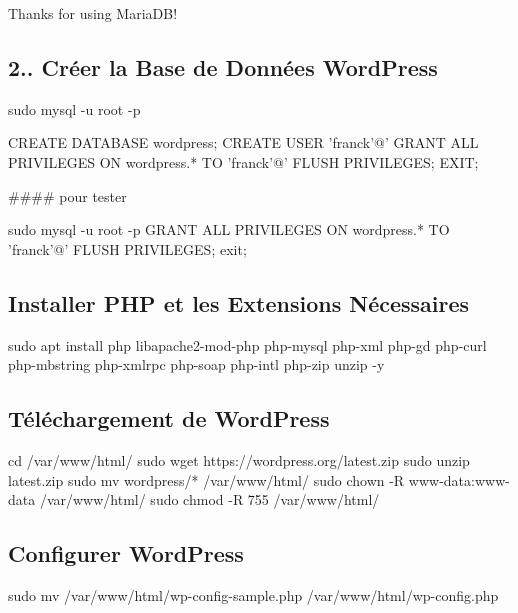 Thanks for using Maria\+D\+B!

\subsection*{2.. Créer la Base de Données Word\+Press}


\begin{DoxyCode}
sudo mysql -u root -p
\end{DoxyCode}



\begin{DoxyCode}
CREATE DATABASE wordpress;
CREATE USER 'franck'@'%
GRANT ALL PRIVILEGES ON wordpress.* TO 'franck'@'%
FLUSH PRIVILEGES;
EXIT;
\end{DoxyCode}


\#\#\#\# pour tester 
\begin{DoxyCode}
sudo mysql -u root -p
GRANT ALL PRIVILEGES ON wordpress.* TO 'franck'@'%
FLUSH PRIVILEGES;
exit;
\end{DoxyCode}
 \subsection*{Installer P\+HP et les Extensions Nécessaires}


\begin{DoxyCode}
sudo apt install php libapache2-mod-php php-mysql php-xml php-gd php-curl php-mbstring php-xmlrpc php-soap
       php-intl php-zip unzip -y
\end{DoxyCode}


\subsection*{Téléchargement de Word\+Press}


\begin{DoxyCode}
cd /var/www/html/
sudo wget https://wordpress.org/latest.zip
sudo unzip latest.zip
sudo mv wordpress/* /var/www/html/
sudo chown -R www-data:www-data /var/www/html/
sudo chmod -R 755 /var/www/html/
\end{DoxyCode}


\subsection*{Configurer Word\+Press}


\begin{DoxyCode}
sudo mv /var/www/html/wp-config-sample.php /var/www/html/wp-config.php
\end{DoxyCode}


